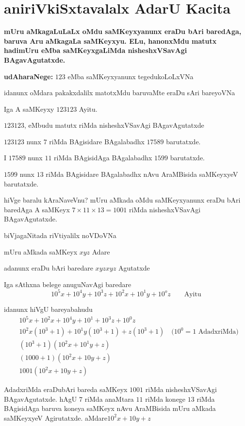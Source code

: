 \chapter{aniriVkiSxtavalalx AdarU Kacita}
\vskip -20pt

{\bf mUru aMkagaLuLaLx oMdu saMKeyxyanunx eraDu bAri baredAga, baruva Aru aMkagaLa saMKeyxyu. ELu, hanonxMdu matutx hadimUru eMba saMKeyxgaLiMda nisheshxVSavAgi BAgavAgutatxde.}

\textbf{udAharaNege:} $123$ eMba saMKeyxyanunx tegedukoLoLxVNa

idanunx oMdara pakakxdalilx matotxMdu baruvaMte eraDu sAri bareyoVNa

Iga A saMKeyxy $123123$ Ayitu.

$123123$, eMbudu {} matutx {} riMda nisheshxVSavAgi BAgavAgutatxde

$123123$ nunx $7$ riMda BAgisidare BAgalabadhx $17589$ barutatxde.

I $17589$ nunx $11$ riMda BAgisidAga BAgalabadhx $1599$ barutatxde.

$1599$ nunx $13$ riMda BAgisidare BAgalabadhx nAvu AraMBisida saMKeyxyeV barutatxde.

hiVge baralu kAraNaveVnu? mUru aMkada oMdu saMKeyxyanunx eraDu bAri baredAga A saMKeyx $7\times 11 \times 13 = 1001$ riMda nisheshxVSavAgi BAgavAgutatxde.

biVjagaNitada riVtiyalilx noVDoVNa

mUru aMkada saMKeyx $xyz$ Adare

adanunx eraDu bAri baredare $xyzxyz$ Agutatxde

Iga sAthxna belege anuguNavAgi baredare
$$
10^5x+10^4y+10^3z+10^2x+10^1y+10^{o}z \qquad\text{Ayitu}
$$

idanunx hiVgU bareyabahudu
\begin{align*}
&10^{5}x+10^{2}x+10^{4}y+10^1+10^{3}z+10^{0}z\\
&10^{2}x\left(10^3+1\right) + 10^{1}y\left(10^3+1\right) + z\left(10^3 + 1\right) \quad\text{($10^0 = 1$ AdadxriMda)}\\
&\left(10^3+1\right)\left(10^{2}x + 10^1{y} + z\right)\\
&(1000+1)\left(10^{2}x+10y+z\right)\\
&1001\left(10^{2}x +10y +z\right)
\end{align*}

AdadxriMda eraDubAri bareda saMKeyx $1001$ riMda nisheshxVSavAgi BAgavAgutatxde. hAgU $7$ riMda anaMtara $11$ riMda konege $13$ riMda BAgisidAga baruva koneya saMKeyx nAvu AraMBisida mUru aMkada saMKeyxyeV Agirutatxde. aMdare\break $10^{2}x+10y+z$

